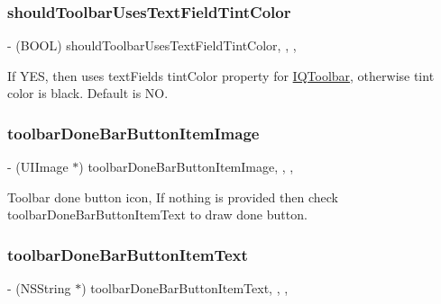 \subsubsection{\texorpdfstring{should\+Toolbar\+Uses\+Text\+Field\+Tint\+Color}{shouldToolbarUsesTextFieldTintColor}}
{\footnotesize\ttfamily -\/ (B\+O\+OL) should\+Toolbar\+Uses\+Text\+Field\+Tint\+Color\hspace{0.3cm}{\ttfamily [read]}, {\ttfamily [write]}, {\ttfamily [nonatomic]}, {\ttfamily [assign]}}

If Y\+ES, then uses text\+Field\textquotesingle{}s tint\+Color property for \mbox{\hyperlink{interface_i_q_toolbar}{I\+Q\+Toolbar}}, otherwise tint color is black. Default is NO. \mbox{\label{interface_i_q_keyboard_manager_a7dbfd50cb46dfb73cfbbde864f7dac1c}} 
\subsubsection{\texorpdfstring{toolbar\+Done\+Bar\+Button\+Item\+Image}{toolbarDoneBarButtonItemImage}}
{\footnotesize\ttfamily -\/ (U\+I\+Image $\ast$) toolbar\+Done\+Bar\+Button\+Item\+Image\hspace{0.3cm}{\ttfamily [read]}, {\ttfamily [write]}, {\ttfamily [nonatomic]}, {\ttfamily [strong]}}

Toolbar done button icon, If nothing is provided then check toolbar\+Done\+Bar\+Button\+Item\+Text to draw done button. \mbox{\label{interface_i_q_keyboard_manager_af522d35b37c048c25e0ccae3533dbaf2}} 
\subsubsection{\texorpdfstring{toolbar\+Done\+Bar\+Button\+Item\+Text}{toolbarDoneBarButtonItemText}}
{\footnotesize\ttfamily -\/ (N\+S\+String $\ast$) toolbar\+Done\+Bar\+Button\+Item\+Text\hspace{0.3cm}{\ttfamily [read]}, {\ttfamily [write]}, {\ttfamily [nonatomic]}, {\ttfamily [strong]}}

